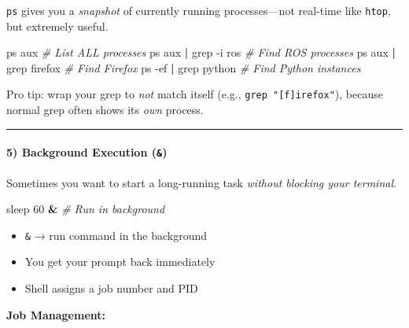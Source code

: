 \documentclass[
  english,
  paper=a4,
  oneside  ,captions=tableheading
]{scrartcl}
\newenvironment{Shaded}{}{}
\newcommand{\AttributeTok}[1]{\textcolor[rgb]{0.49,0.56,0.16}{#1}}
\newcommand{\CommentTok}[1]{\textcolor[rgb]{0.38,0.63,0.69}{\textit{#1}}}
\newcommand{\FunctionTok}[1]{\textcolor[rgb]{0.02,0.16,0.49}{#1}}
\newcommand{\KeywordTok}[1]{\textcolor[rgb]{0.00,0.44,0.13}{\textbf{#1}}}
\newcommand{\NormalTok}[1]{#1}
\providecommand{\tightlist}{%
  \setlength{\itemsep}{0pt}\setlength{\parskip}{0pt}}
\begin{document}
\texttt{ps} gives you a \emph{snapshot} of currently running
processes---not real-time like \texttt{htop}, but extremely useful.

\begin{Shaded}
\begin{Highlighting}[]
\FunctionTok{ps}\NormalTok{ aux                    }\CommentTok{\# List ALL processes}
\FunctionTok{ps}\NormalTok{ aux }\KeywordTok{|} \FunctionTok{grep} \AttributeTok{{-}i}\NormalTok{ ros      }\CommentTok{\# Find ROS processes}
\FunctionTok{ps}\NormalTok{ aux }\KeywordTok{|} \FunctionTok{grep}\NormalTok{ firefox     }\CommentTok{\# Find Firefox}
\FunctionTok{ps} \AttributeTok{{-}ef} \KeywordTok{|} \FunctionTok{grep}\NormalTok{ python      }\CommentTok{\# Find Python instances}
\end{Highlighting}
\end{Shaded}

\faExclamationCircle Pro tip: wrap your grep to \emph{not} match itself
(e.g., \texttt{grep\ "{[}f{]}irefox"}), because normal grep often shows
its \emph{own} process.

\begin{center}\rule{0.5\linewidth}{0.5pt}\end{center}

\paragraph{\texorpdfstring{5) Background Execution
(\texttt{\&})}{5) Background Execution (\&)}}\label{background-execution}

Sometimes you want to start a long-running task \emph{without blocking
your terminal}.

\begin{Shaded}
\begin{Highlighting}[]
\FunctionTok{sleep}\NormalTok{ 60 }\KeywordTok{\&}                \CommentTok{\# Run in background}
\end{Highlighting}
\end{Shaded}

\begin{itemize}
\tightlist
\item
  \texttt{\&} → run command in the background
\item
  You get your prompt back immediately
\item
  Shell assigns a job number and PID
\end{itemize}

\textbf{Job Management:}
\end{document}
